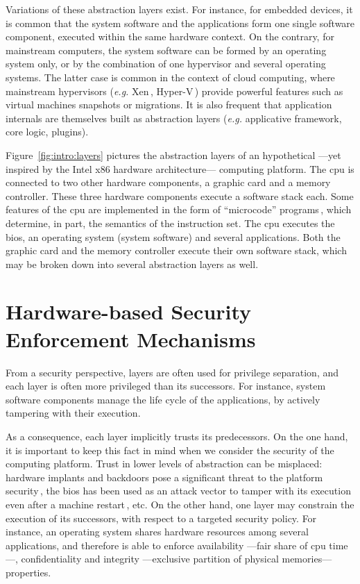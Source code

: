 Variations of these abstraction layers exist.
%
For instance, for embedded devices, it is common that the system software and
the applications form one single software component, executed within the same
hardware context.
%
On the contrary, for mainstream computers, the system software can be formed by
an operating system only, or by the combination of one hypervisor and several
operating systems.
%
The latter case is common in the context of cloud computing, where mainstream
hypervisors (\emph{e.g.} Xen\,\cite{barham2003xen},
Hyper-V\,\cite{velte2009hyperv}) provide powerful features such as virtual
machines snapshots or migrations.
%
It is also frequent that application internals are themselves built as
abstraction layers (\emph{e.g.} applicative framework, core logic, plugins).

Figure~\ref{fig:intro:layers} pictures the abstraction layers of an hypothetical
---yet inspired by the Intel x86 hardware architecture--- computing platform.
%
The \ac{cpu} is connected to two other hardware components, a graphic card and a
memory controller.
%
These three hardware components execute a software stack each.
%
Some features of the \ac{cpu} are implemented in the form of ``microcode''
programs\,\cite{chen2014microcode}, which determine, in part, the semantics of
the instruction set.
%
The \ac{cpu} executes the \ac{bios}, an operating system (system software) and
several applications.
%
Both the graphic card and the memory controller execute their own software
stack, which may be broken down into several abstraction layers as well.

\section{Hardware-based Security Enforcement Mechanisms}

From a security perspective, layers are often used for privilege separation, and
each layer is often more privileged than its successors.
%
For instance, system software components manage the life cycle of the
applications, by actively tampering with their execution.

As a consequence, each layer implicitly trusts its predecessors.
%
On the one hand, it is important to keep this fact in mind when we consider the
security of the computing platform.
%
Trust in lower levels of abstraction can be misplaced: hardware implants and
backdoors pose a significant threat to the platform security\,\cite{yang2016a2},
the \ac{bios} has been used as an attack vector to tamper with its execution
even after a machine restart\,\cite{embleton2013smm}, etc.
%
On the other hand, one layer may constrain the execution of its successors, with
respect to a targeted security policy.
%
For instance, an operating system shares hardware resources among several
applications, and therefore is able to enforce availability ---fair share of
\ac{cpu} time---, confidentiality and integrity ---exclusive partition of
physical memories--- properties.

